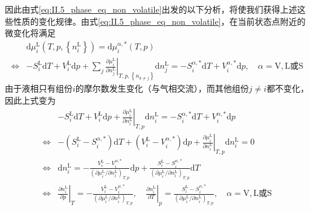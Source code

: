 \documentclass[main.tex]{subfiles}
\begin{document}
因此由式\eqref{eq:II.5_phase_eq_non_volatile}出发的以下分析，将使我们获得上述这些性质的变化规律。由式\eqref{eq:II.5_phase_eq_non_volatile}，在当前状态点附近的微变化将满足
\begin{align*}
                    & \mathrm{d}\mu_i^\text{L}\left(T,p,\left\{n_i^\text{L}\right\}\right)=\mathrm{d}\mu_i^{\alpha,*}\left(T,p\right)                                                                                                                                                       \\
    \Leftrightarrow & -S_i^\text{L}\mathrm{d}T+V_i^\text{L}\mathrm{d}p+\sum_j\left.\frac{\partial \mu_i^\text{L}}{\partial n_j^\text{L}}\right|_{T,p,\left\{n_{k\neq j}\right\}}\mathrm{d}n_j^\text{L}=-S_i^{\alpha,*}\mathrm{d}T+V_i^{\alpha,*}\mathrm{d}p,\quad\alpha=\text{V},\text{L或S}
\end{align*}
由于液相只有组份$i$的摩尔数发生变化（与气相交流），而其他组份$j\neq i$都不变化，因此上式变为
\begin{align*}
                    & -S_i^\text{L}\mathrm{d}T+V_i^\text{L}\mathrm{d}p+\left.\frac{\partial\mu_i^\text{L}}{\partial n_i^\text{L}}\right|_{T,p}\mathrm{d}n_i^\text{L}=-S_i^{\alpha,*}\mathrm{d}T+V_i^{\alpha,*}\mathrm{d}p                                                                                                                                                               \\
    \Leftrightarrow & -\left(S_i^\text{L}-S_i^{\alpha,*}\right)\mathrm{d}T+\left(V_i^\text{L}-V_i^{\alpha,*}\right)\mathrm{d}p+\left.\frac{\partial \mu_i^\text{L}}{\partial n_i^\text{L}}\right|_{T,p}\mathrm{d}n_i^\text{L}=0                                                                                                                                                         \\
    \Leftrightarrow & \mathrm{d}n_i^\text{L}=-\frac{V_i^\text{L}-V_i^{\alpha,*}}{\left(\partial\mu_i^\text{L}/\partial n_i^\text{L}\right)_{T,p}}\mathrm{d}p+\frac{S_i^\text{L}-S_i^{\alpha,*}}{\left(\partial\mu_i^\text{L}/\partial n_i^\text{L}\right)_{T,p}} \mathrm{d}T                                                                                                            \\
    \Leftrightarrow & \left.\frac{\partial n_i^\text{L}}{\partial p}\right|_{T}=-\frac{V_i^\text{L}-V_i^{\alpha,*}}{\left(\partial\mu_i^\text{L}/\partial n_i^\text{L}\right)_{T,p}},\quad\left.\frac{\partial n_i^\text{L}}{\partial T}\right|_{p}=\frac{S_i^\text{L}-S_i^{\alpha,*}}{\left(\partial\mu_i^\text{L}/\partial n_i^\text{L}\right)_{T,p}},\quad\alpha=\text{V},\text{L或S}
\end{align*}
\end{document}

